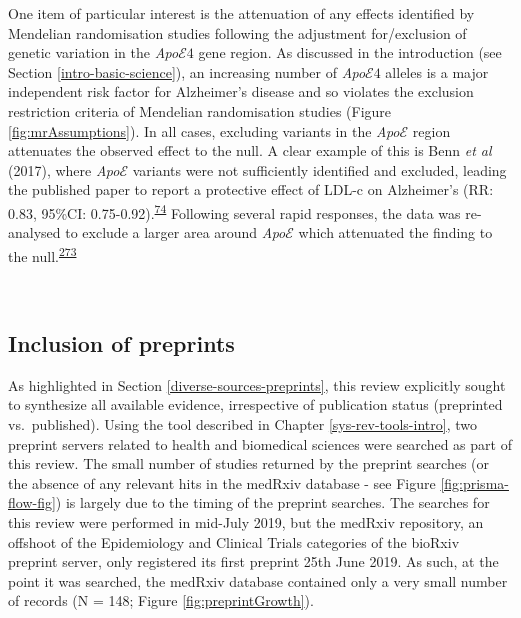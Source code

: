 \documentclass[a4paper, twoside]{templates/ociamthesis}
\begin{document}
One item of particular interest is the attenuation of any effects identified by Mendelian randomisation studies following the adjustment for/exclusion of genetic variation in the \emph{Apo}\(\mathcal{E}4\) gene region. As discussed in the introduction (see Section \ref{intro-basic-science}), an increasing number of \emph{Apo}\(\mathcal{E}4\) alleles is a major independent risk factor for Alzheimer's disease and so violates the exclusion restriction criteria of Mendelian randomisation studies (Figure \ref{fig:mrAssumptions}). In all cases, excluding variants in the \emph{Apo}\(\mathcal{E}\) region attenuates the observed effect to the null. A clear example of this is Benn \emph{et al} (2017), where \emph{Apo}\(\mathcal{E}\) variants were not sufficiently identified and excluded, leading the published paper to report a protective effect of LDL-c on Alzheimer's (RR: 0.83, 95\%CI: 0.75-0.92).\textsuperscript{\protect\hyperlink{ref-benn2017}{74}} Following several rapid responses, the data was re-analysed to exclude a larger area around \emph{Apo}\(\mathcal{E}\) which attenuated the finding to the null.\textsuperscript{\protect\hyperlink{ref-benn2017comment}{273}}

~

\hypertarget{inclusion-of-preprints}{%
\subsection{Inclusion of preprints}\label{inclusion-of-preprints}}

As highlighted in Section \ref{diverse-sources-preprints}, this review explicitly sought to synthesize all available evidence, irrespective of publication status (preprinted vs.~published). Using the tool described in Chapter \ref{sys-rev-tools-intro}, two preprint servers related to health and biomedical sciences were searched as part of this review. The small number of studies returned by the preprint searches (or the absence of any relevant hits in the medRxiv database - see Figure \ref{fig:prisma-flow-fig}) is largely due to the timing of the preprint searches. The searches for this review were performed in mid-July 2019, but the medRxiv repository, an offshoot of the Epidemiology and Clinical Trials categories of the bioRxiv preprint server, only registered its first preprint 25th June 2019. As such, at the point it was searched, the medRxiv database contained only a very small number of records (N = 148; Figure \ref{fig:preprintGrowth}).

~
\end{document}
